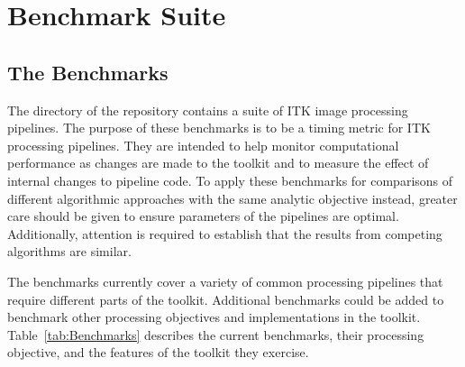 \documentclass{InsightArticle}
\begin{document}
\section{Benchmark Suite}

\subsection{The Benchmarks}

The  directory of the 
repository contains a suite of ITK image processing pipelines.  The purpose of
these benchmarks is to be a timing metric for ITK processing pipelines.  They
are intended to help monitor computational performance as changes are made to
the toolkit and to measure the effect of internal changes to pipeline code.
To apply these benchmarks for comparisons of different algorithmic approaches
with the same analytic objective instead, greater care should be given to
ensure parameters of the pipelines are optimal. Additionally, attention is
required to establish that the results from competing algorithms are similar.

The benchmarks currently cover a variety of common processing pipelines that
require different parts of the toolkit. Additional benchmarks could be added
to benchmark other processing objectives and implementations in the toolkit.
Table~\ref{tab:Benchmarks} describes the current benchmarks, their processing
objective, and the features of the toolkit they exercise.
\end{document}
